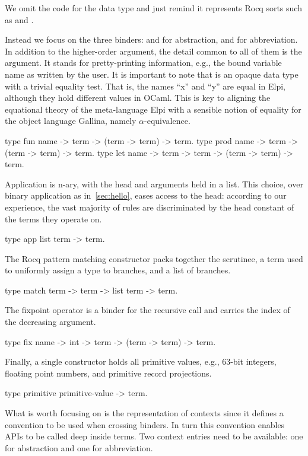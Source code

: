 \documentclass{these-ISSS}
\newenvironment{elpicode}
  {\VerbatimEnvironment\begin{elpibox}\begin{xelpicode}}{\end{xelpicode}
\end{elpibox}}
\begin{document}
\noindent
We omit the code for the  data type and just remind it
represents Rocq sorts such as  and .

Instead we focus on the three
binders:  and  for abstraction, and  for
abbreviation. In addition to the higher-order argument, the detail common to
all of them is the  argument. It stands for pretty-printing
information, e.g., the bound variable name as written by the user. It is important
to note that  is an opaque data type with a trivial equality test.
That is, the names ``x'' and ``y'' are equal in Elpi, although they hold
different values in OCaml. This is key to aligning the equational theory of
the meta-language Elpi with a sensible notion of equality for the object
language Gallina, namely $\alpha$-equivalence.

\begin{elpicode}
type fun  name -> term -> (term -> term) -> term.            %
type prod name -> term -> (term -> term) -> term.            %
type let  name -> term -> term -> (term -> term) -> term.    %
\end{elpicode}

\noindent
Application is n-ary, with the head and arguments held in a list. This choice,
over binary application as in~\cref{sec:hello}, eases access to the head:
according to our experience, the vast majority of rules are discriminated by
the head constant of the terms they operate on.
\begin{elpicode}
type app       list term -> term.                     
\end{elpicode}
\noindent
The Rocq pattern matching constructor packs together the scrutinee, a term
used to uniformly assign a type to branches, and a list of branches.
\begin{elpicode}
type match     term -> term -> list term -> term.   
\end{elpicode}
\noindent
The
fixpoint operator is a binder for the recursive call and carries the index of
the decreasing argument. 
\begin{elpicode}
type fix       name -> int -> term -> (term -> term) -> term.
\end{elpicode}
\noindent
Finally, a single constructor holds all primitive
values, e.g., 63-bit integers, floating point numbers, and primitive record
projections.
\begin{elpicode}
type primitive primitive-value -> term.
\end{elpicode}
What is worth focusing on is the representation of contexts since it
defines a convention to be used when crossing binders. In turn
this convention enables APIs to be called deep inside terms. Two
context entries need to be available: one for abstraction and one for
abbreviation.
\end{document}
